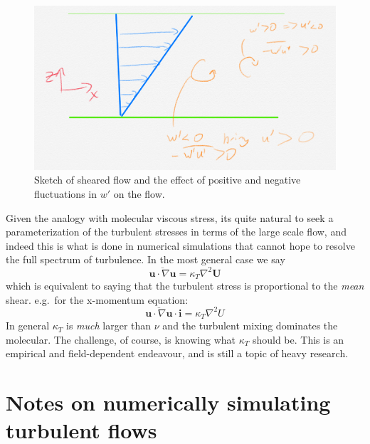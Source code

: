 \documentclass[11pt]{article}
\begin{document}
\begin{figure}[hbtp]
  \begin{center}
    \includegraphics[width=5in]{images/ReynoldsStress}
    \caption{Sketch of sheared flow and the effect of positive and negative
fluctuations in $w'$ on the flow.}   
    \label{fig:ReynoldsStress}
  \end{center}
\end{figure}

Given the analogy with molecular viscous stress, its quite natural to seek a
parameterization of the turbulent stresses in terms of the large scale flow,
and indeed this is what is done in numerical simulations that cannot hope to
resolve the full spectrum of turbulence.  In the most general case we say
\begin{equation}
  \overline{\mathbf{u}\cdot \nabla \mathbf{u}} = \kappa_T \nabla^2 \mathbf{U}
\end{equation}
which is equivalent to saying that the turbulent stress is proportional to the
\emph{mean} shear. e.g.\ for the x-momentum equation:
\begin{equation}
  \overline{\mathbf{u}\cdot \nabla \mathbf{u}}\cdot \mathbf{i} = \kappa_T
\nabla^2 U
\end{equation}
In general $\kappa_T$ is \emph{much} larger than $\nu$ and the turbulent mixing
dominates the molecular.   The challenge, of course, is knowing what $\kappa_T$
should be.  This is an empirical and field-dependent endeavour, and is still a
topic of heavy research.  

\section{Notes on numerically simulating turbulent flows}
\end{document}
